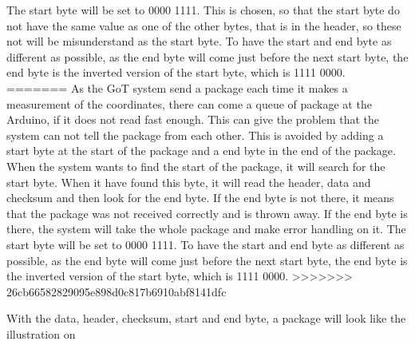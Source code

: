 The start byte will be set to 0000 1111. This is chosen, so that the start byte do not have the same value as one of the other bytes, that is in the header, so these not will be misunderstand as the start byte. To have the start and end byte as different as possible, as the end byte will come just before the next start byte, the end byte is the inverted version of the start byte, which is 1111 0000.
=======
As the GoT system send a package each time it makes a measurement of the coordinates, there can come a queue of package at the Arduino, if it does not read fast enough. This can give the problem that the system can not tell the package from each other. This is avoided by adding a start byte at the start of the package and a end byte in the end of the package. When the system wants to find the start of the package, it will search for the start byte. When it have found this byte, it will read the header, data and checksum and then look for the end byte. If the end byte is not there, it means that the package was not received correctly and is thrown away. If the end byte is there, the system will take the whole package and make error handling on it. The start byte will be set to 0000 1111. To have the start and end byte as different as possible, as the end byte will come just before the next start byte, the end byte is the inverted version of the start byte, which is 1111 0000.
>>>>>>> 26cb66582829095e898d0c817b6910abf8141dfc

With the data, header, checksum, start and end byte, a package will look like the illustration on 

